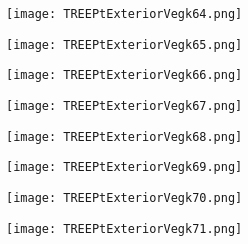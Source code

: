 \documentclass[pdf]{beamer}
\begin{document}
\begin{frame}
\begin{figure}[!h]
\centering
\texttt{[image: TREEPtExteriorVegk64.png]}
\end{figure}
\end{frame}

\begin{frame}
\begin{figure}[!h]
\centering
\texttt{[image: TREEPtExteriorVegk65.png]}
\end{figure}
\end{frame}

\begin{frame}
\begin{figure}[!h]
\centering
\texttt{[image: TREEPtExteriorVegk66.png]}
\end{figure}
\end{frame}

\begin{frame}
\begin{figure}[!h]
\centering
\texttt{[image: TREEPtExteriorVegk67.png]}
\end{figure}
\end{frame}

\begin{frame}
\begin{figure}[!h]
\centering
\texttt{[image: TREEPtExteriorVegk68.png]}
\end{figure}
\end{frame}

\begin{frame}
\begin{figure}[!h]
\centering
\texttt{[image: TREEPtExteriorVegk69.png]}
\end{figure}
\end{frame}

\begin{frame}
\begin{figure}[!h]
\centering
\texttt{[image: TREEPtExteriorVegk70.png]}
\end{figure}
\end{frame}

\begin{frame}
\begin{figure}[!h]
\centering
\texttt{[image: TREEPtExteriorVegk71.png]}
\end{figure}
\end{frame}
\end{document}

